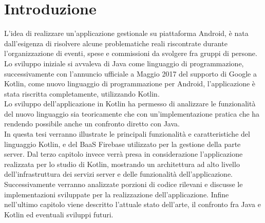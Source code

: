 \chapter*{Introduzione}                 %

L'idea di realizzare un'applicazione gestionale su piattaforma Android, è nata dall'esigenza di risolvere alcune problematiche reali riscontrate durante l'organizzazione di eventi, spese e commissioni da svolgere fra gruppi di persone.\\
Lo sviluppo iniziale si avvaleva di Java come linguaggio di programmazione, successivamente con l'annuncio ufficiale a Maggio 2017 del supporto di Google a Kotlin, come nuovo linguaggio di programmazione per Android, l'applicazione è stata riscritta completamente, utilizzando Kotlin.\\
Lo sviluppo dell'applicazione in Kotlin ha permesso di  analizzare le funzionalità del nuovo linguaggio sia teoricamente che con un'implementazione pratica che ha rendendo possibile anche un confronto diretto con Java.\\
In questa tesi verranno illustrate le principali funzionalità e caratteristiche del linguaggio Kotlin, e del BaaS Firebase utilizzato per la gestione della parte server. Dal terzo capitolo invece verrà presa in considerazione l'applicazione realizzata per lo studio di Kotlin, mostrando un architettura ad alto livello dell'infrastruttura dei servizi server e delle funzionalità dell'applicazione. Successivamente verranno analizzate porzioni di codice rilevani e discusse le implementazioni sviluppate per la realizzazione dell'applicazione. Infine nell'ultimo capitolo viene descritto l'attuale stato dell'arte, il confronto fra Java e Kotlin ed eventuali sviluppi futuri.
\clearpage{\pagestyle{empty}\cleardoublepage}
